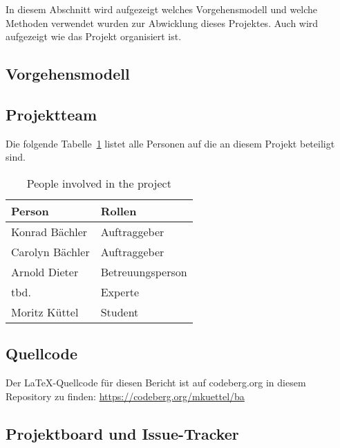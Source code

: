In diesem Abschnitt wird aufgezeigt welches Vorgehensmodell und welche Methoden verwendet wurden zur Abwicklung dieses Projektes.
Auch wird aufgezeigt wie das Projekt organisiert ist.

\subsection{Vorgehensmodell}



\subsection{Projektteam}

Die folgende Tabelle~\ref{tab:projectmembers} listet alle Personen auf die an diesem Projekt beteiligt sind.

\begin{table}[H]
    \begin{tabular}{l p{3.2cm}}
        \toprule
        \bfseries Person   & \bfseries Rollen \\
        \midrule
        Konrad Bächler     & Auftraggeber \\
        \midrule
        Carolyn Bächler    & Auftraggeber \\
        \midrule
        Arnold Dieter      & Betreuungsperson \\
        \midrule
        tbd.               & Experte \\
        \midrule
        Moritz Küttel      & Student \\
        \bottomrule
    \end{tabular}
    \caption{People involved in the project}\label{tab:projectmembers}
\end{table}

\subsection{Quellcode}

Der \LaTeX-Quellcode für diesen Bericht ist auf codeberg.org in diesem Repository zu finden:
\url{https://codeberg.org/mkuettel/ba}


\subsection{Projektboard und Issue-Tracker}

